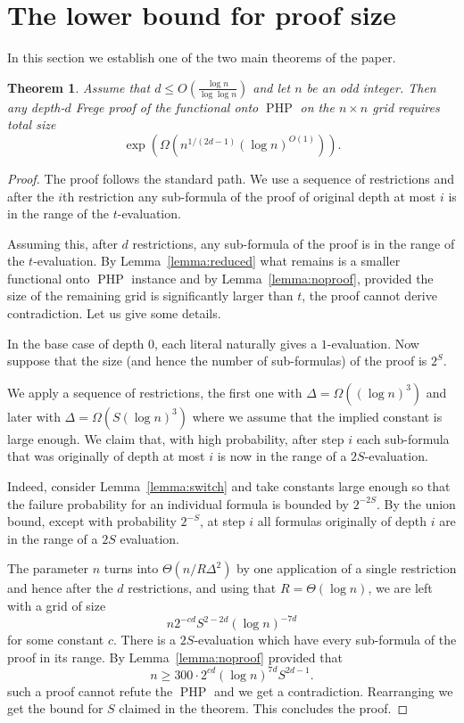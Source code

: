 \documentclass{article}\usepackage[a4paper,margin=20mm]{geometry}
\newtheorem{theorem}{Theorem}\newtheorem{lemma}[theorem]{Lemma}\newtheorem{proposition}[theorem]{Proposition}\newtheorem{corollary}[theorem]{Corollary}\newtheorem{definition}[theorem]{Definition}\newtheorem{claim}[theorem]{Claim}\newtheorem{remark}[theorem]{Remark}\newtheorem{observation}[theorem]{Observation}\newtheorem{conjecture}[theorem]{Conjecture}\newtheorem{example}[theorem]{Example}
\DeclareMathOperator{\PHP}{PHP}
\begin{document}
\section{The lower bound for proof size}\label{sec:size}

In this section we establish one of the two main theorems
of the paper.

\begin{theorem}\label{thm:size}
Assume that $d \leq O(\frac{\log n}{\log {\log n}})$ and let
$n$ be an odd integer. Then any depth-$d$ Frege proof of
the functional onto $\PHP$ on the $n \times n$ grid requires total size
$$
\exp (\Omega (n^{1/(2d-1)} (\log n)^{O(1)})).
$$
\end{theorem}

\begin{proof}
The proof follows the standard path.  We use
a sequence of restrictions and after the $i$th
restriction any sub-formula of the proof
of original depth at most $i$ is in the range of the $t$-evaluation.

Assuming this, after $d$ restrictions, any sub-formula
of the proof is in the range of the $t$-evaluation.
By Lemma~\ref{lemma:reduced} what remains is a smaller
functional onto $\PHP$ instance and
by Lemma~\ref{lemma:noproof}, provided the
size of the remaining grid is significantly larger than
$t$, the proof cannot derive contradiction.  Let us give
some details.

In the base case of depth $0$, each literal naturally gives
a $1$-evaluation.  Now
suppose that the size (and hence the number of sub-formulas)
of the proof is $2^S$.

We apply a sequence of restrictions, the first
one with $\Delta= \Omega ((\log n) ^3)$ and later with
$\Delta= \Omega (S(\log n) ^3)$ where we assume that
the implied constant is large enough.  We claim that,
with high probability, after step $i$ each sub-formula that was originally
of depth at most $i$ is now in the range of a $2S$-evaluation.

Indeed, consider Lemma~\ref{lemma:switch} and take
constants large enough so that the failure probability for
an individual formula is bounded by $2^{-2S}$.  By the
union bound, except with probability $2^{-S}$, at step
$i$ all formulas originally of depth $i$ are
in the range of a $2S$ evaluation.

The parameter $n$ turns into $\Theta (n/R\Delta^2)$ by one
application of a single restriction and
hence after the $d$ restrictions, and using
that $R=\Theta (\log n)$,  we are left with
a grid of size
$$
n 2^{-cd} S^{2-2d} (\log n)^{-7d}
$$
for some constant $c$.  There is 
a $2S$-evaluation which have every sub-formula
of the proof in its range.  By Lemma~\ref{lemma:noproof}
provided that 
$$
n \geq 300 \cdot 2^{cd} (\log n)^{7d} S^{2d-1}.
$$
such a proof cannot refute the $\PHP$ and we get
a contradiction.  Rearranging we get the bound for $S$
claimed in the theorem.
This concludes the proof.
\end{proof}
\end{document}
